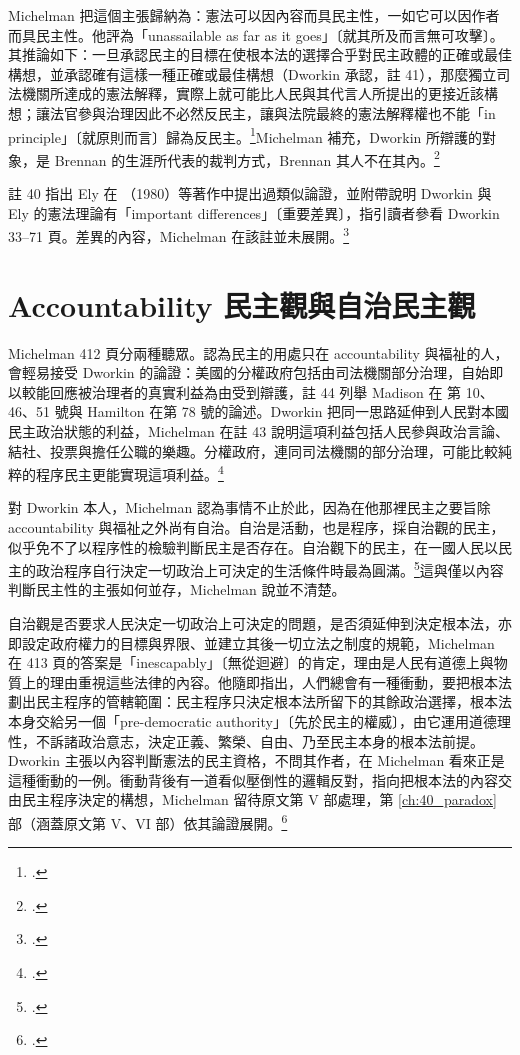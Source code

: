 Michelman 把這個主張歸納為：憲法可以因內容而具民主性，一如它可以因作者而具民主性。他評為「unassailable as far as it goes」〔就其所及而言無可攻擊〕。其推論如下：一旦承認民主的目標在使根本法的選擇合乎對民主政體的正確或最佳構想，並承認確有這樣一種正確或最佳構想（Dworkin 承認，註 41），那麼獨立司法機關所達成的憲法解釋，實際上就可能比人民與其代言人所提出的更接近該構想；讓法官參與治理因此不必然反民主，讓與法院最終的憲法解釋權也不能「in principle」〔就原則而言〕歸為反民主。\footcite[411--412 \& nn.41--42]{michelman1998}Michelman 補充，Dworkin 所辯護的對象，是 Brennan 的生涯所代表的裁判方式，Brennan 其人不在其內。\footcite[412]{michelman1998}

註 40 指出 Ely 在 （1980）等著作中提出過類似論證，並附帶說明 Dworkin 與 Ely 的憲法理論有「important differences」〔重要差異〕，指引讀者參看 Dworkin  33--71 頁。差異的內容，Michelman 在該註並未展開。\footcite[411 n.40]{michelman1998}

\section{Accountability 民主觀與自治民主觀}
\label{sec:30_dworkin-2}

Michelman 412 頁分兩種聽眾。認為民主的用處只在 accountability 與福祉的人，會輕易接受 Dworkin 的論證：美國的分權政府包括由司法機關部分治理，自始即以較能回應被治理者的真實利益為由受到辯護，註 44 列舉 Madison 在  第 10、46、51 號與 Hamilton 在第 78 號的論述。Dworkin 把同一思路延伸到人民對本國民主政治狀態的利益，Michelman 在註 43 說明這項利益包括人民參與政治言論、結社、投票與擔任公職的樂趣。分權政府，連同司法機關的部分治理，可能比較純粹的程序民主更能實現這項利益。\footcite[412 \& nn.43--44]{michelman1998}

對 Dworkin 本人，Michelman 認為事情不止於此，因為在他那裡民主之要旨除 accountability 與福祉之外尚有自治。自治是活動，也是程序，採自治觀的民主，似乎免不了以程序性的檢驗判斷民主是否存在。自治觀下的民主，在一國人民以民主的政治程序自行決定一切政治上可決定的生活條件時最為圓滿。\footcite[412]{michelman1998}這與僅以內容判斷民主性的主張如何並存，Michelman 說並不清楚。

自治觀是否要求人民決定一切政治上可決定的問題，是否須延伸到決定根本法，亦即設定政府權力的目標與界限、並建立其後一切立法之制度的規範，Michelman 在 413 頁的答案是「inescapably」〔無從迴避〕的肯定，理由是人民有道德上與物質上的理由重視這些法律的內容。他隨即指出，人們總會有一種衝動，要把根本法劃出民主程序的管轄範圍：民主程序只決定根本法所留下的其餘政治選擇，根本法本身交給另一個「pre-democratic authority」〔先於民主的權威〕，由它運用道德理性，不訴諸政治意志，決定正義、繁榮、自由、乃至民主本身的根本法前提。Dworkin 主張以內容判斷憲法的民主資格，不問其作者，在 Michelman 看來正是這種衝動的一例。衝動背後有一道看似壓倒性的邏輯反對，指向把根本法的內容交由民主程序決定的構想，Michelman 留待原文第 V 部處理，第 \ref{ch:40_paradox} 部（涵蓋原文第 V、VI 部）依其論證展開。\footcite[413]{michelman1998}

